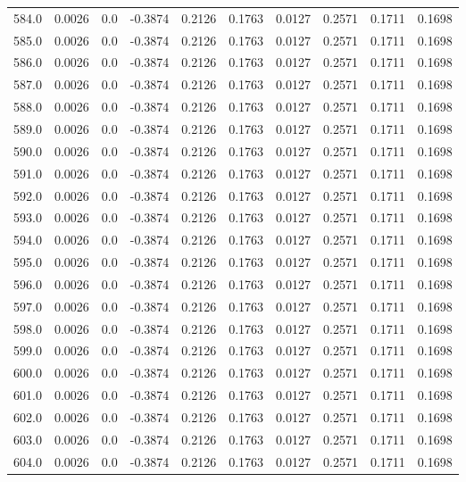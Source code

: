 \begin{longtable}{lrrrrrrrrr}
584.0 & 0.0026 & 0.0 & -0.3874 & 0.2126 & 0.1763 & 0.0127 & 0.2571 & 0.1711 & 0.1698 \\
585.0 & 0.0026 & 0.0 & -0.3874 & 0.2126 & 0.1763 & 0.0127 & 0.2571 & 0.1711 & 0.1698 \\
586.0 & 0.0026 & 0.0 & -0.3874 & 0.2126 & 0.1763 & 0.0127 & 0.2571 & 0.1711 & 0.1698 \\
587.0 & 0.0026 & 0.0 & -0.3874 & 0.2126 & 0.1763 & 0.0127 & 0.2571 & 0.1711 & 0.1698 \\
588.0 & 0.0026 & 0.0 & -0.3874 & 0.2126 & 0.1763 & 0.0127 & 0.2571 & 0.1711 & 0.1698 \\
589.0 & 0.0026 & 0.0 & -0.3874 & 0.2126 & 0.1763 & 0.0127 & 0.2571 & 0.1711 & 0.1698 \\
590.0 & 0.0026 & 0.0 & -0.3874 & 0.2126 & 0.1763 & 0.0127 & 0.2571 & 0.1711 & 0.1698 \\
591.0 & 0.0026 & 0.0 & -0.3874 & 0.2126 & 0.1763 & 0.0127 & 0.2571 & 0.1711 & 0.1698 \\
592.0 & 0.0026 & 0.0 & -0.3874 & 0.2126 & 0.1763 & 0.0127 & 0.2571 & 0.1711 & 0.1698 \\
593.0 & 0.0026 & 0.0 & -0.3874 & 0.2126 & 0.1763 & 0.0127 & 0.2571 & 0.1711 & 0.1698 \\
594.0 & 0.0026 & 0.0 & -0.3874 & 0.2126 & 0.1763 & 0.0127 & 0.2571 & 0.1711 & 0.1698 \\
595.0 & 0.0026 & 0.0 & -0.3874 & 0.2126 & 0.1763 & 0.0127 & 0.2571 & 0.1711 & 0.1698 \\
596.0 & 0.0026 & 0.0 & -0.3874 & 0.2126 & 0.1763 & 0.0127 & 0.2571 & 0.1711 & 0.1698 \\
597.0 & 0.0026 & 0.0 & -0.3874 & 0.2126 & 0.1763 & 0.0127 & 0.2571 & 0.1711 & 0.1698 \\
598.0 & 0.0026 & 0.0 & -0.3874 & 0.2126 & 0.1763 & 0.0127 & 0.2571 & 0.1711 & 0.1698 \\
599.0 & 0.0026 & 0.0 & -0.3874 & 0.2126 & 0.1763 & 0.0127 & 0.2571 & 0.1711 & 0.1698 \\
600.0 & 0.0026 & 0.0 & -0.3874 & 0.2126 & 0.1763 & 0.0127 & 0.2571 & 0.1711 & 0.1698 \\
601.0 & 0.0026 & 0.0 & -0.3874 & 0.2126 & 0.1763 & 0.0127 & 0.2571 & 0.1711 & 0.1698 \\
602.0 & 0.0026 & 0.0 & -0.3874 & 0.2126 & 0.1763 & 0.0127 & 0.2571 & 0.1711 & 0.1698 \\
603.0 & 0.0026 & 0.0 & -0.3874 & 0.2126 & 0.1763 & 0.0127 & 0.2571 & 0.1711 & 0.1698 \\
604.0 & 0.0026 & 0.0 & -0.3874 & 0.2126 & 0.1763 & 0.0127 & 0.2571 & 0.1711 & 0.1698 \\

\end{longtable}

